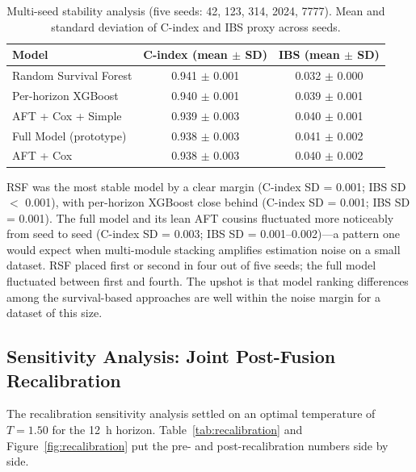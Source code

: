 \documentclass[fire,article,submit,pdftex]{../Definitions/mdpi}
\begin{document}
\begin{table}[!ht]
\caption{Multi-seed stability analysis (five seeds: 42, 123, 314, 2024, 7777). Mean and standard deviation of C-index and IBS proxy across seeds.}\label{tab:stability}
\begin{tabular}{lcc}
\toprule
\textbf{Model} & \textbf{C-index (mean $\pm$ SD)} & \textbf{IBS (mean $\pm$ SD)} \\
\midrule
Random Survival Forest & 0.941 $\pm$ 0.001 & 0.032 $\pm$ 0.000 \\
Per-horizon XGBoost    & 0.940 $\pm$ 0.001 & 0.039 $\pm$ 0.001 \\
AFT + Cox + Simple     & 0.939 $\pm$ 0.003 & 0.040 $\pm$ 0.001 \\
Full Model (prototype) & 0.938 $\pm$ 0.003 & 0.041 $\pm$ 0.002 \\
AFT + Cox              & 0.938 $\pm$ 0.003 & 0.040 $\pm$ 0.002 \\
\bottomrule
\end{tabular}
\end{table}

RSF was the most stable model by a clear margin (C-index SD = 0.001; IBS SD $<$ 0.001), with per-horizon XGBoost close behind (C-index SD = 0.001; IBS SD = 0.001).
The full model and its lean AFT cousins fluctuated more noticeably from seed to seed (C-index SD = 0.003; IBS SD = 0.001--0.002)---a pattern one would expect when multi-module stacking amplifies estimation noise on a small dataset.
RSF placed first or second in four out of five seeds; the full model fluctuated between first and fourth.
The upshot is that model ranking differences among the survival-based approaches are well within the noise margin for a dataset of this size.

\subsection{Sensitivity Analysis: Joint Post-Fusion Recalibration}\label{sec:recal_results}

The recalibration sensitivity analysis settled on an optimal temperature of $T = 1.50$ for the 12~h horizon.
Table~\ref{tab:recalibration} and Figure~\ref{fig:recalibration} put the pre- and post-recalibration numbers side by side.
\end{document}

